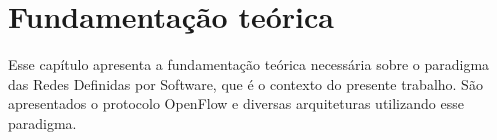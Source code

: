 \chapter{Fundamentação teórica}

Esse capítulo apresenta a fundamentação teórica necessária sobre o paradigma 
das Redes Definidas por Software, que é o contexto do presente trabalho.
São apresentados o protocolo OpenFlow e diversas arquiteturas utilizando esse
paradigma.






